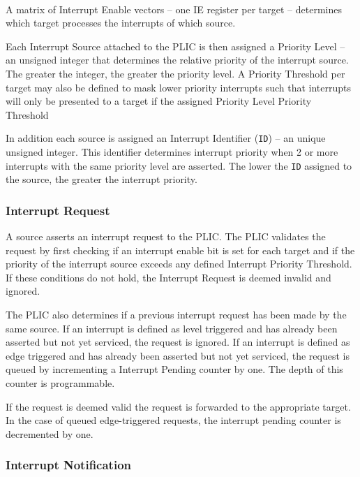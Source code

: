 \paragraph{}

A matrix of Interrupt Enable vectors -- one IE register per target --
determines which target processes the interrupts of which source.

Each Interrupt Source attached to the PLIC is then assigned a Priority
Level -- an unsigned integer that determines the relative priority of
the interrupt source. The greater the integer, the greater the priority
level. A Priority Threshold per target may also be defined to mask lower
priority interrupts such that interrupts will only be presented to a
target if the assigned Priority Level Priority Threshold

In addition each source is assigned an Interrupt Identifier
(\texttt{ID}) -- an unique unsigned integer. This identifier determines
interrupt priority when 2 or more interrupts with the same priority
level are asserted. The lower the \texttt{ID} assigned to the source,
the greater the interrupt priority.

\subsubsection{Interrupt Request}

A source asserts an interrupt request to the PLIC. The PLIC validates
the request by first checking if an interrupt enable bit is set for each
target and if the priority of the interrupt source exceeds any defined
Interrupt Priority Threshold. If these conditions do not hold, the
Interrupt Request is deemed invalid and ignored.

The PLIC also determines if a previous interrupt request has been made
by the same source. If an interrupt is defined as level triggered and
has already been asserted but not yet serviced, the request is ignored.
If an interrupt is defined as edge triggered and has already been
asserted but not yet serviced, the request is queued by incrementing a
Interrupt Pending counter by one. The depth of this counter is
programmable.

If the request is deemed valid the request is forwarded to the
appropriate target. In the case of queued edge-triggered requests, the
interrupt pending counter is decremented by one.

\subsubsection{Interrupt Notification}

